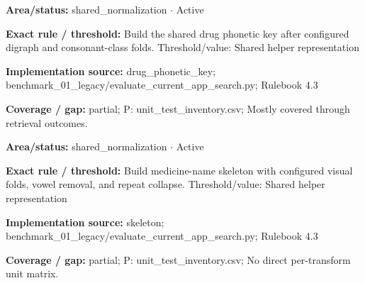 \begin{tcolorbox}[enhanced,breakable,colback=white,colframe=Muted!45,boxrule=0.45pt,arc=1.5pt,left=6pt,right=6pt,top=5pt,bottom=5pt,title={\texttt{SH-NORM-PHONETIC-05}},title after break={\texttt{SH-NORM-PHONETIC-05}\ (continued)},fonttitle=\headingfont\bfseries\color{Navy},coltitle=Navy]
\textbf{Area/status:} shared\_\allowbreak{}normalization $\boldsymbol{\cdot}$ Active\par
\smallskip
\textbf{Exact rule / threshold:} Build the shared drug phonetic key after configured digraph and consonant-class folds. Threshold/\allowbreak{}value: Shared helper representation\par
\smallskip
\textbf{Implementation source:} drug\_\allowbreak{}phonetic\_\allowbreak{}key; benchmark\_\allowbreak{}01\_\allowbreak{}legacy/\allowbreak{}evaluate\_\allowbreak{}current\_\allowbreak{}app\_\allowbreak{}search.py; Rulebook 4.3\par
\smallskip
\textbf{Coverage / gap:} partial; P: unit\_\allowbreak{}test\_\allowbreak{}inventory.csv; Mostly covered through retrieval outcomes.
\end{tcolorbox}
\begin{tcolorbox}[enhanced,breakable,colback=white,colframe=Muted!45,boxrule=0.45pt,arc=1.5pt,left=6pt,right=6pt,top=5pt,bottom=5pt,title={\texttt{SH-NORM-SKELETON-04}},title after break={\texttt{SH-NORM-SKELETON-04}\ (continued)},fonttitle=\headingfont\bfseries\color{Navy},coltitle=Navy]
\textbf{Area/status:} shared\_\allowbreak{}normalization $\boldsymbol{\cdot}$ Active\par
\smallskip
\textbf{Exact rule / threshold:} Build medicine-name skeleton with configured visual folds, vowel removal, and repeat collapse. Threshold/\allowbreak{}value: Shared helper representation\par
\smallskip
\textbf{Implementation source:} skeleton; benchmark\_\allowbreak{}01\_\allowbreak{}legacy/\allowbreak{}evaluate\_\allowbreak{}current\_\allowbreak{}app\_\allowbreak{}search.py; Rulebook 4.3\par
\smallskip
\textbf{Coverage / gap:} partial; P: unit\_\allowbreak{}test\_\allowbreak{}inventory.csv; No direct per-transform unit matrix.
\end{tcolorbox}
